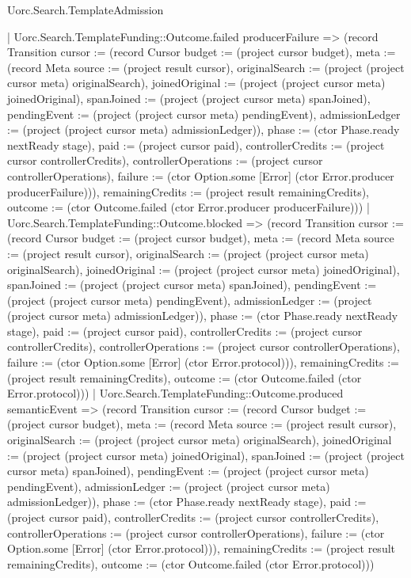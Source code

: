 \begin{lexlean}{Uorc.Search.TemplateAdmission}
\begin{semanticmodule}
{    | Uorc.Search.TemplateFunding::Outcome.failed producerFailure => (record Transition {cursor := (record Cursor {budget := (project cursor budget), meta := (record Meta {source := (project result cursor), originalSearch := (project (project cursor meta) originalSearch), joinedOriginal := (project (project cursor meta) joinedOriginal), spanJoined := (project (project cursor meta) spanJoined), pendingEvent := (project (project cursor meta) pendingEvent), admissionLedger := (project (project cursor meta) admissionLedger)}), phase := (ctor Phase.ready nextReady stage), paid := (project cursor paid), controllerCredits := (project cursor controllerCredits), controllerOperations := (project cursor controllerOperations), failure := (ctor Option.some [Error] (ctor Error.producer producerFailure))}), remainingCredits := (project result remainingCredits), outcome := (ctor Outcome.failed (ctor Error.producer producerFailure))})
    | Uorc.Search.TemplateFunding::Outcome.blocked => (record Transition {cursor := (record Cursor {budget := (project cursor budget), meta := (record Meta {source := (project result cursor), originalSearch := (project (project cursor meta) originalSearch), joinedOriginal := (project (project cursor meta) joinedOriginal), spanJoined := (project (project cursor meta) spanJoined), pendingEvent := (project (project cursor meta) pendingEvent), admissionLedger := (project (project cursor meta) admissionLedger)}), phase := (ctor Phase.ready nextReady stage), paid := (project cursor paid), controllerCredits := (project cursor controllerCredits), controllerOperations := (project cursor controllerOperations), failure := (ctor Option.some [Error] (ctor Error.protocol))}), remainingCredits := (project result remainingCredits), outcome := (ctor Outcome.failed (ctor Error.protocol))})
    | Uorc.Search.TemplateFunding::Outcome.produced semanticEvent => (record Transition {cursor := (record Cursor {budget := (project cursor budget), meta := (record Meta {source := (project result cursor), originalSearch := (project (project cursor meta) originalSearch), joinedOriginal := (project (project cursor meta) joinedOriginal), spanJoined := (project (project cursor meta) spanJoined), pendingEvent := (project (project cursor meta) pendingEvent), admissionLedger := (project (project cursor meta) admissionLedger)}), phase := (ctor Phase.ready nextReady stage), paid := (project cursor paid), controllerCredits := (project cursor controllerCredits), controllerOperations := (project cursor controllerOperations), failure := (ctor Option.some [Error] (ctor Error.protocol))}), remainingCredits := (project result remainingCredits), outcome := (ctor Outcome.failed (ctor Error.protocol))})
}
\end{semanticmodule}
\end{lexlean}
